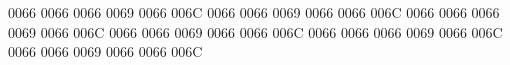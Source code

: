 \usepackage{microtype}            %


      {0066 0066}
      {0066 0069}
      {0066 006C}
     {0066 0066 0069}
     {0066 0066 006C}
     {0066 0066}
     {0066 0069}
     {0066 006C}
   {0066 0066 0069}
   {0066 0066 006C}
 {0066 0066}
 {0066 0069}
 {0066 006C}
 {0066 0066 0069}
 {0066 0066 006C}
\usepackage{wasysym}              %
\usepackage{graphicx}             %

\usepackage{xcolor}               %

\usepackage{geometry}             %
\usepackage{fancyhdr}             %
\usepackage{lastpage}             %
\usepackage{titlesec}             %
\usepackage{sectsty}              %
\usepackage{enumitem}             %

\usepackage[hidelinks]{hyperref}  %

\frenchspacing




